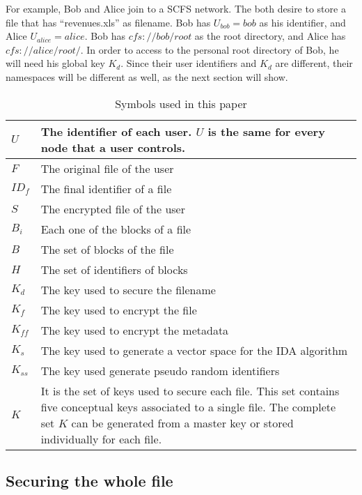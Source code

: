 \documentclass{llncs}
\begin{document}
For example, Bob and Alice join to a SCFS network. The both desire to store a file that has ``revenues.xls'' as filename. Bob has $U_{bob}=bob$ as his identifier, and Alice $U_{alice}=alice$.  Bob has $cfs://bob/root$ as the root directory, and Alice has $cfs://alice/root/$. In order to access to the personal root directory of Bob, he will need his global key $K_d$. Since their user identifiers and $K_d$ are different, their namespaces will be different as well, as the next section will show.

\begin{table}[t]%
\centering%
\begin{tabular}{lp{}}
\\\hline
$U$ & The identifier of each user. $U$ is the same for every node that a user controls. \\\hline
$F$ & The original file of the user \\\hline
$ID_f$ & The final identifier of a file \\\hline
$S$ & The encrypted file of the user \\\hline
$B_i$ & Each one of the blocks of a file \\\hline
$B$ & The set of blocks of the file \\\hline
$H$ & The set of identifiers of blocks \\\hline
$K_d$ & The key used to secure the filename \\\hline
$K_f$ & The key used to encrypt the file \\\hline
$K_{ff}$ & The key used to encrypt the metadata \\\hline
$K_s$ & The key used to generate a vector space for the IDA algorithm \\\hline
$K_{ss}$ & The key used generate pseudo random identifiers \\\hline
$K$ & It is the set of keys used to secure each file. This set contains five conceptual keys associated to a single file.
The complete set $K$ can be generated from a master key or stored individually for each file. \\\hline
\end{tabular}
\caption{Symbols used in this paper}
\label{tab:symbols}
\end{table}

\subsection{Securing the whole file}
\label{sec:wholefile}
\end{document}
